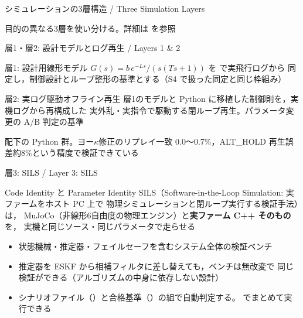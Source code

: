 \begin{frame}{シミュレーションの3層構造 / Three Simulation Layers}
  \begin{center}
    \resizebox{0.95\textwidth}{!}{}
  \end{center}

  {\footnotesize 目的の異なる3層を使い分ける。詳細は  を参照}
\end{frame}

\begin{frame}{層1・層2: 設計モデルとログ再生 / Layers 1 \& 2}
  \begin{exampleblock}{層1: 設計用線形モデル}\small
    $G(s) = b\,e^{-Ls}/(s(Ts+1))$ を  で実飛行ログから
    同定し，制御設計とループ整形の基準とする（S4 で扱った同定と同じ枠組み）
  \end{exampleblock}

  \vspace{0.5em}

  \begin{block}{層2: 実ログ駆動オフライン再生}\small
    層1のモデルと Python に移植した制御則を，実機ログから再構成した
    実外乱・実指令で駆動する閉ループ再生。パラメータ変更の A/B 判定の基準
  \end{block}

  {\footnotesize {} 配下の Python 群。ヨー$\kappa$修正のリプレイ一致
  0.0〜0.7\%，ALT\_HOLD 再生誤差約8\%という精度で検証できている}
\end{frame}

\begin{frame}{層3: SILS / Layer 3: SILS}
  \begin{block}{Code Identity と Parameter Identity}\small
    SILS（Software-in-the-Loop Simulation: 実ファームをホスト PC 上で
    物理シミュレーションと閉ループ実行する検証手法）は，
    MuJoCo（非線形6自由度の物理エンジン）と\textbf{実ファーム C++ そのもの}を，
    実機と同じソース・同じパラメータで走らせる
  \end{block}

  \vspace{0.5em}

  \begin{itemize}\small
    \item 状態機械・推定器・フェイルセーフを含むシステム全体の検証ベンチ
    \item 推定器を ESKF から相補フィルタに差し替えても，ベンチは無改変で
          同じ検証ができる（アルゴリズムの中身に依存しない設計）
    \item シナリオファイル（）と合格基準（）の組で自動判定する。
           でまとめて実行できる
  \end{itemize}
\end{frame}

